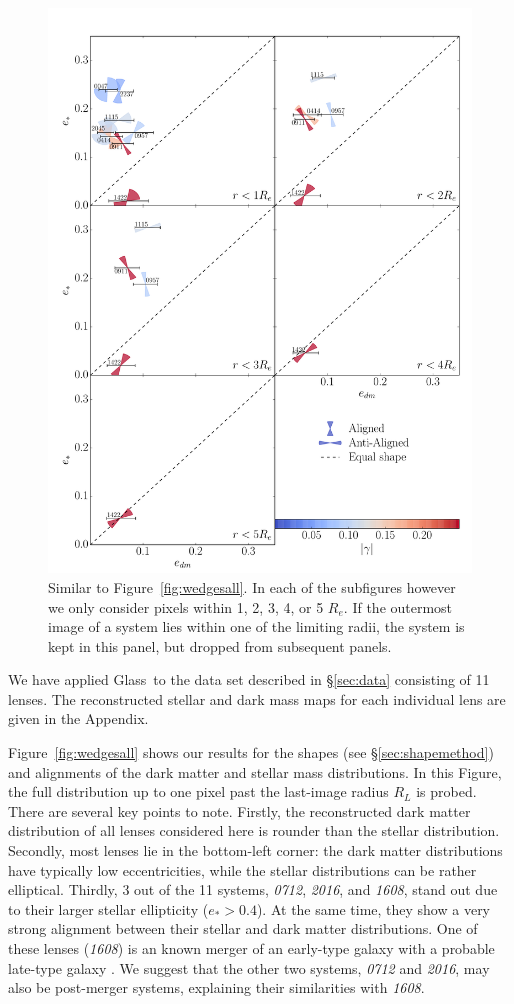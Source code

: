 \documentclass[useAMS,usenatbib]{mn2e}
\def\Glass{{\sc Glass}}
\begin{document}
\begin{figure}
  \centering
  \includegraphics[width=.8\linewidth]{Figures/wedges.pdf}
  \caption[width=\linewidth]{Similar to Figure~\ref{fig:wedgesall}. In each of the subfigures however we only consider pixels within 1, 2, 3, 4, or 5 $R_e$. If the outermost image of a system lies within one of the limiting radii, the system is kept in this panel, but dropped from subsequent panels.}
  \label{fig:wedgesradii}
\end{figure}

We have applied \Glass\ to the data set described in \S\ref{sec:data} consisting of 11 lenses. The reconstructed stellar and dark mass maps for each individual lens are given in the Appendix.

Figure~\ref{fig:wedgesall} shows our results for the shapes (see \S\ref{sec:shapemethod}) and alignments of the dark matter and stellar mass distributions. In this Figure, the full distribution up to one pixel past the last-image radius $R_{L}$ is probed. There are several key points to note. Firstly, the reconstructed dark matter distribution of all lenses considered here is rounder than the stellar distribution. Secondly, most lenses lie in the bottom-left corner: the dark matter distributions have typically low eccentricities, while the stellar distributions can be rather elliptical. Thirdly, 3 out of the 11 systems, {\it0712}, {\it2016}, and {\it1608}, stand out due to their larger stellar ellipticity ($e_* > 0.4$). At the same time, they show a very strong alignment between their stellar and dark matter distributions. One of these lenses ({\it1608}) is an known merger of an early-type galaxy with a probable late-type galaxy \citep{2003ApJ...584..100S}. We suggest that the other two systems, {\it0712} and {\it2016}, may also be post-merger systems, explaining their similarities with {\it1608}.
\end{document}
